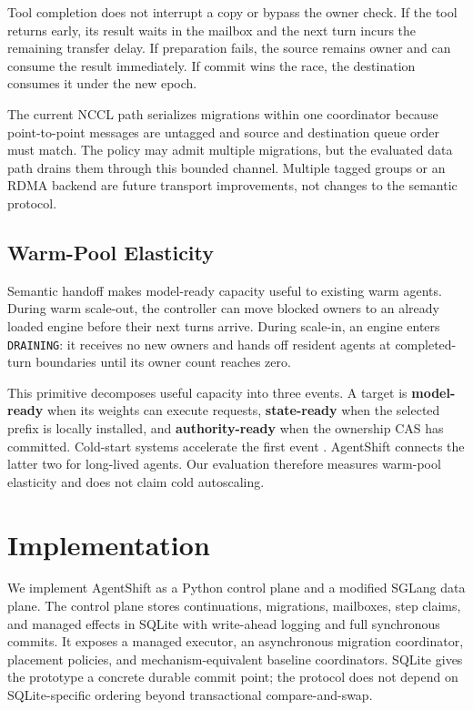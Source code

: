 Tool completion does not interrupt a copy or bypass the owner check. If the tool returns early, its result waits in the mailbox and the next turn incurs the remaining transfer delay. If preparation fails, the source remains owner and can consume the result immediately. If commit wins the race, the destination consumes it under the new epoch.

The current NCCL path serializes migrations within one coordinator because point-to-point messages are untagged and source and destination queue order must match. The policy may admit multiple migrations, but the evaluated data path drains them through this bounded channel. Multiple tagged groups or an RDMA backend are future transport improvements, not changes to the semantic protocol.

\subsection{Warm-Pool Elasticity}\label{warm-pool-elasticity}

Semantic handoff makes model-ready capacity useful to existing warm agents. During warm scale-out, the controller can move blocked owners to an already loaded engine before their next turns arrive. During scale-in, an engine enters \texttt{DRAINING}: it receives no new owners and hands off resident agents at completed-turn boundaries until its owner count reaches zero.

This primitive decomposes useful capacity into three events. A target is \textbf{model-ready} when its weights can execute requests, \textbf{state-ready} when the selected prefix is locally installed, and \textbf{authority-ready} when the ownership CAS has committed. Cold-start systems accelerate the first event \cite{blitzscale, serverlessllm}. AgentShift connects the latter two for long-lived agents. Our evaluation therefore measures warm-pool elasticity and does not claim cold autoscaling.

\section{Implementation}\label{implementation}

We implement AgentShift as a Python control plane and a modified SGLang data plane. The control plane stores continuations, migrations, mailboxes, step claims, and managed effects in SQLite with write-ahead logging and full synchronous commits. It exposes a managed executor, an asynchronous migration coordinator, placement policies, and mechanism-equivalent baseline coordinators. SQLite gives the prototype a concrete durable commit point; the protocol does not depend on SQLite-specific ordering beyond transactional compare-and-swap.

